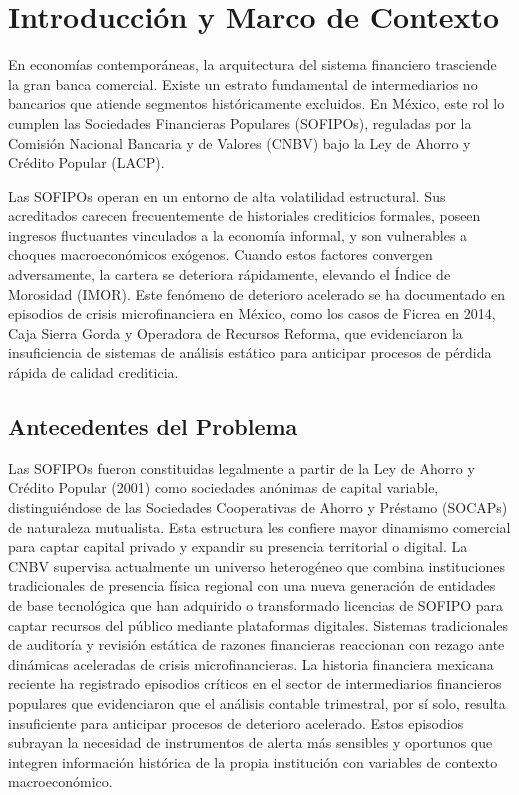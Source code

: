 \chapter{Introducción y Marco de Contexto}

En economías contemporáneas, la arquitectura del sistema financiero trasciende la gran banca comercial. Existe un estrato fundamental de intermediarios no bancarios que atiende segmentos históricamente excluidos. En México, este rol lo cumplen las Sociedades Financieras Populares (SOFIPOs), reguladas por la Comisión Nacional Bancaria y de Valores (CNBV) bajo la Ley de Ahorro y Crédito Popular (LACP).

Las SOFIPOs operan en un entorno de alta volatilidad estructural. Sus acreditados carecen frecuentemente de historiales crediticios formales, poseen ingresos fluctuantes vinculados a la economía informal, y son vulnerables a choques macroeconómicos exógenos. Cuando estos factores convergen adversamente, la cartera se deteriora rápidamente, elevando el Índice de Morosidad (IMOR). Este fenómeno de deterioro acelerado se ha documentado en episodios de crisis microfinanciera en México, como los casos de Ficrea en 2014, Caja Sierra Gorda y Operadora de Recursos Reforma, que evidenciaron la insuficiencia de sistemas de análisis estático para anticipar procesos de pérdida rápida de calidad crediticia.

\section{Antecedentes del Problema}
Las SOFIPOs fueron constituidas legalmente a partir de la Ley de Ahorro y Crédito Popular (2001) como sociedades anónimas de capital variable, distinguiéndose de las Sociedades Cooperativas de Ahorro y Préstamo (SOCAPs) de naturaleza mutualista. Esta estructura les confiere mayor dinamismo comercial para captar capital privado y expandir su presencia territorial o digital. La CNBV supervisa actualmente un universo heterogéneo que combina instituciones tradicionales de presencia física regional con una nueva generación de entidades de base tecnológica que han adquirido o transformado licencias de SOFIPO para captar recursos del público mediante plataformas digitales.
Sistemas tradicionales de auditoría y revisión estática de razones financieras reaccionan con rezago ante dinámicas aceleradas de crisis microfinancieras. La historia financiera mexicana reciente ha registrado episodios críticos en el sector de intermediarios financieros populares que evidenciaron que el análisis contable trimestral, por sí solo, resulta insuficiente para anticipar procesos de deterioro acelerado. Estos episodios subrayan la necesidad de instrumentos de alerta más sensibles y oportunos que integren información histórica de la propia institución con variables de contexto macroeconómico.

